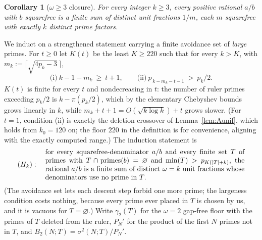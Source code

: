 \documentclass[11pt]{amsart}
\theoremstyle{plain}
\newtheorem{corollary}[theorem]{Corollary}
\theoremstyle{definition}
\begin{document}
\begin{corollary}[$\omega\ge3$ closure]\label{cor:omegak}
For every integer $k\ge3$, every positive rational $a/b$ with $b$ squarefree is a
finite sum of distinct unit fractions $1/m$, each $m$ squarefree with exactly $k$
distinct prime factors.
\end{corollary}

We induct on a strengthened statement carrying a finite avoidance set of
\emph{large} primes.  For $t\ge0$ let $K(t)$ be the least $K\ge220$ such that for
every $k>K$, with $m_k:=\lceil\sqrt{4p_k-3}\,\rceil$,
\[
  \text{(i)}\ k-1-m_k\ \ge\ t+1,
  \qquad
  \text{(ii)}\ p_{\,k-m_k-t-1}\ >\ p_k/2 .
\]
$K(t)$ is finite for every $t$ and nondecreasing in $t$: the number of ruler
primes exceeding $p_k/2$ is $k-\pi(p_k/2)$, which by the elementary Chebyshev
bounds grows linearly in $k$, while $m_k+t+1=O(\sqrt{k\log k})+t$ grows slower.
(For $t=1$, condition (ii) is exactly the deletion crossover of
Lemma~\ref{lem:Aunif}, which holds from $k_0=120$ on; the floor $220$ in the
definition is for convenience, aligning with the exactly computed range.)  The induction statement is
\[
  (H_k):\quad\parbox{0.82\textwidth}{for every squarefree-denominator $a/b$ and
  every finite set $T$ of primes with $T\cap\mathrm{primes}(b)=\varnothing$ and
  $\min(T)>p_{K(|T|+k)}$, the rational $a/b$ is a finite sum of distinct
  $\omega=k$ unit fractions whose denominators use no prime in $T$.}
\]
(The avoidance set lets each descent step forbid one more prime; the largeness
condition costs nothing, because every prime ever placed in $T$ is chosen by us,
and it is vacuous for $T=\varnothing$.)  Write $\gamma_2(T)$ for the $\omega=2$
gap-free floor with the primes of $T$ deleted from the ruler, $P_N'$ for the
product of the first $N$ primes not in $T$, and $B_2(N;T)=\sigma^2(N;T)/P_N'$.
\end{document}
